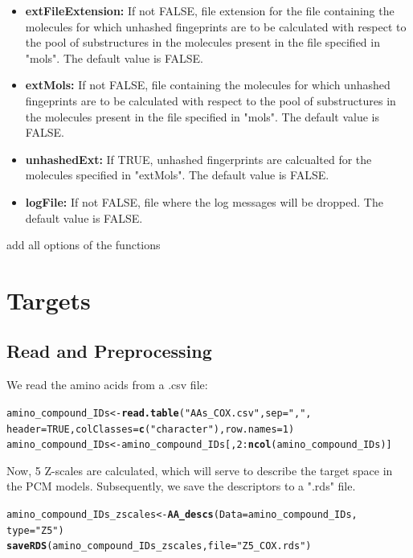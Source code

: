 \documentclass[twoside,a4wide,12pt]{article}\usepackage[]{graphicx}\usepackage[]{color}
\makeatletter
\newcommand{\hlnum}[1]{\textcolor[rgb]{0.686,0.059,0.569}{#1}}%
\newcommand{\hlstr}[1]{\textcolor[rgb]{0.192,0.494,0.8}{#1}}%
\newcommand{\hlopt}[1]{\textcolor[rgb]{0,0,0}{#1}}%
\newcommand{\hlstd}[1]{\textcolor[rgb]{0.345,0.345,0.345}{#1}}%
\newcommand{\hlkwb}[1]{\textcolor[rgb]{0.69,0.353,0.396}{#1}}%
\newcommand{\hlkwc}[1]{\textcolor[rgb]{0.333,0.667,0.333}{#1}}%
\newcommand{\hlkwd}[1]{\textcolor[rgb]{0.737,0.353,0.396}{\textbf{#1}}}%
\newenvironment{kframe}{%
 \def\at@end@of@kframe{}%
 \ifinner\ifhmode%
  \def\at@end@of@kframe{\end{minipage}}%
  \begin{minipage}{\columnwidth}%
 \fi\fi%
 \def\FrameCommand##1{\hskip\@totalleftmargin \hskip-\fboxsep
 \colorbox{shadecolor}{##1}\hskip-\fboxsep
     \hskip-\linewidth \hskip-\@totalleftmargin \hskip\columnwidth}%
 \MakeFramed {\advance\hsize-\width
   \@totalleftmargin\z@ \linewidth\hsize
   \@setminipage}}%
 {\par\unskip\endMakeFramed%
 \at@end@of@kframe}
\newenvironment{knitrout}{}{} %
\makeatother
\begin{document}
\begin{itemize}
\item {\bf extFileExtension:} If not FALSE, file extension for the file containing the molecules for which unhashed fingeprints are to be calculated with respect to the pool of substructures in the molecules present in the file specified in "mols". The default value is FALSE.
\item {\bf extMols:} If not FALSE, file containing the molecules for which unhashed fingeprints are to be calculated with respect to the pool of
substructures in the molecules present in the file specified in "mols". The default value is FALSE.
\item {\bf unhashedExt:} If TRUE, unhashed fingerprints are calcualted for the molecules specified in "extMols". The default value is FALSE.
\item {\bf logFile:} If not FALSE, file where the log messages will be dropped. The default value is FALSE.
\end{itemize}


add all options of the functions

\section{Targets}

\subsection{Read and Preprocessing}
We read the amino acids from a .csv file:
\begin{knitrout}
\color{fgcolor}\begin{kframe}
\begin{alltt}
\hlstd{amino_compound_IDs} \hlkwb{<-} \hlkwd{read.table}\hlstd{(}\hlstr{"AAs_COX.csv"}\hlstd{,} \hlkwc{sep} \hlstd{=} \hlstr{","}\hlstd{,}
    \hlkwc{header} \hlstd{=} \hlnum{TRUE}\hlstd{,} \hlkwc{colClasses} \hlstd{=} \hlkwd{c}\hlstd{(}\hlstr{"character"}\hlstd{),} \hlkwc{row.names} \hlstd{=} \hlnum{1}\hlstd{)}
\hlstd{amino_compound_IDs} \hlkwb{<-} \hlstd{amino_compound_IDs[,} \hlnum{2}\hlopt{:}\hlkwd{ncol}\hlstd{(amino_compound_IDs)]}
\end{alltt}
\end{kframe}
\end{knitrout}

Now, 5 Z-scales are calculated, which will serve to describe the target space in the PCM models.
Subsequently, we save the descriptors to a ".rds" file.
\begin{knitrout}
\color{fgcolor}\begin{kframe}
\begin{alltt}
\hlstd{amino_compound_IDs_zscales} \hlkwb{<-} \hlkwd{AA_descs}\hlstd{(}\hlkwc{Data} \hlstd{= amino_compound_IDs,}
    \hlkwc{type} \hlstd{=} \hlstr{"Z5"}\hlstd{)}
\hlkwd{saveRDS}\hlstd{(amino_compound_IDs_zscales,} \hlkwc{file} \hlstd{=} \hlstr{"Z5_COX.rds"}\hlstd{)}
\end{alltt}
\end{kframe}
\end{knitrout}
\end{document}
